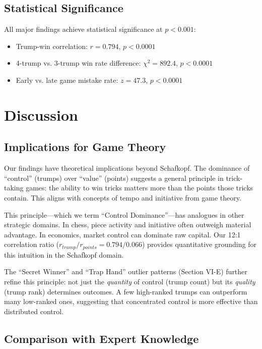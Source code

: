 \documentclass[conference]{IEEEtran}
\begin{document}
\subsection{Statistical Significance}

All major findings achieve statistical significance at $p < 0.001$:

\begin{itemize}
    \item Trump-win correlation: $r = 0.794$, $p < 0.0001$
    \item 4-trump vs. 3-trump win rate difference: $\chi^2 = 892.4$, $p < 0.0001$
    \item Early vs. late game mistake rate: $z = 47.3$, $p < 0.0001$
\end{itemize}

\section{Discussion}

\subsection{Implications for Game Theory}

Our findings have theoretical implications beyond Schafkopf. The dominance of ``control'' (trumps) over ``value'' (points) suggests a general principle in trick-taking games: the ability to win tricks matters more than the points those tricks contain. This aligns with concepts of tempo and initiative from game theory.

This principle---which we term ``Control Dominance''---has analogues in other strategic domains. In chess, piece activity and initiative often outweigh material advantage. In economics, market control can dominate raw capital. Our 12:1 correlation ratio ($r_{trump}/r_{points} = 0.794/0.066$) provides quantitative grounding for this intuition in the Schafkopf domain.

The ``Secret Winner'' and ``Trap Hand'' outlier patterns (Section VI-E) further refine this principle: not just the \textit{quantity} of control (trump count) but its \textit{quality} (trump rank) determines outcomes. A few high-ranked trumps can outperform many low-ranked ones, suggesting that concentrated control is more effective than distributed control.

\subsection{Comparison with Expert Knowledge}
\end{document}
